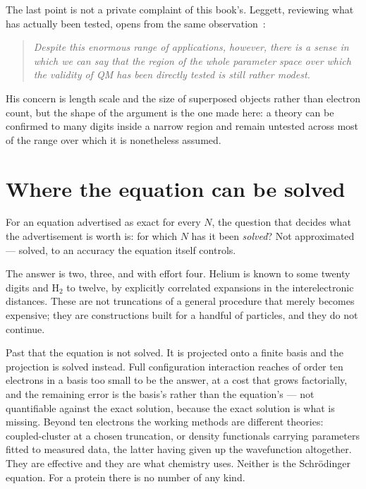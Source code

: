 The last point is not a private complaint of this book's. Leggett, reviewing what has actually been
tested, opens from the same observation~\cite[p.~R415]{Leggett2002}:
\begin{quote}
\itshape Despite this enormous range of applications, however, there is a sense in which we can say
that the region of the whole parameter space over which the validity of QM has been directly tested
is still rather modest.
\end{quote}
His concern is length scale and the size of superposed objects rather than electron count, but the
shape of the argument is the one made here: a theory can be confirmed to many digits inside a
narrow region and remain untested across most of the range over which it is nonetheless assumed.

\section{Where the equation can be solved}\label{sec:prec-solve}

For an equation advertised as exact for every $N$, the question that decides what the advertisement
is worth is: for which $N$ has it been \emph{solved}? Not approximated --- solved, to an accuracy
the equation itself controls.

The answer is two, three, and with effort four. Helium is known to some twenty digits and H$_2$ to
twelve, by explicitly correlated expansions in the interelectronic distances. These are not
truncations of a general procedure that merely becomes expensive; they are constructions built for
a handful of particles, and they do not continue.

Past that the equation is not solved. It is projected onto a finite basis and the projection is
solved instead. Full configuration interaction reaches of order ten electrons in a basis too small
to be the answer, at a cost that grows factorially, and the remaining error is the basis's rather
than the equation's --- not quantifiable against the exact solution, because the exact solution is
what is missing. Beyond ten electrons the working methods are different theories: coupled-cluster
at a chosen truncation, or density functionals carrying parameters fitted to measured data, the
latter having given up the wavefunction altogether. They are effective and they are what chemistry
uses. Neither is the Schr\"odinger equation. For a protein there is no number of any kind.


